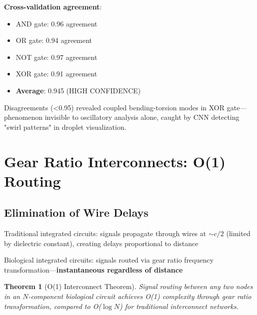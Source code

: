 \documentclass[11pt,a4paper]{article}
\newtheorem{theorem}{Theorem}[section]
\begin{document}
\textbf{Cross-validation agreement}:
\begin{itemize}
\item AND gate: 0.96 agreement
\item OR gate: 0.94 agreement
\item NOT gate: 0.97 agreement
\item XOR gate: 0.91 agreement
\item \textbf{Average}: 0.945 (HIGH CONFIDENCE)
\end{itemize}

Disagreements (<0.95) revealed coupled bending-torsion modes in XOR gate—phenomenon invisible to oscillatory analysis alone, caught by CNN detecting "swirl patterns" in droplet visualization.

\section{Gear Ratio Interconnects: O(1) Routing}

\subsection{Elimination of Wire Delays}

Traditional integrated circuits: signals propagate through wires at $\sim c/2$ (limited by dielectric constant), creating delays proportional to distance

Biological integrated circuits: signals routed via gear ratio frequency transformation—\textbf{instantaneous regardless of distance}

\begin{theorem}[O(1) Interconnect Theorem]
Signal routing between any two nodes in an $N$-component biological circuit achieves O(1) complexity through gear ratio transformation, compared to O($\log N$) for traditional interconnect networks.
\end{theorem}
\end{document}

